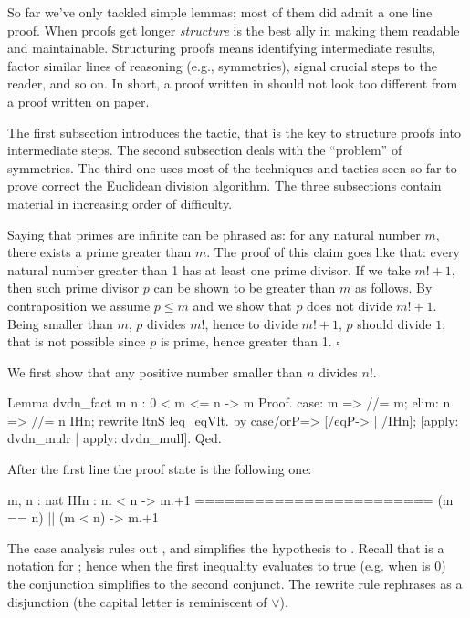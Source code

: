 So far we've only tackled simple lemmas; most of them did admit a one line
proof.  When proofs get longer \emph{structure} is the best ally in making
them readable and maintainable.  Structuring proofs means identifying
intermediate results, factor similar lines of reasoning (e.g., symmetries),
signal crucial steps to the reader, and so on.  In short, a
proof written in \Coq{} should not look too different from a proof
written on paper.

The first subsection introduces the  tactic, that is the key
to structure proofs into intermediate steps.  The second subsection
deals with the ``problem'' of symmetries.  The third one uses most
of the techniques and tactics seen so far to prove correct the
Euclidean division algorithm.  The three subsections contain
material in increasing order of difficulty.

\label{sec:infprimes}

Saying that primes are infinite can be phrased as: for any natural number
$m$, there exists a prime greater than $m$.  The proof of this claim goes like
that: every natural number greater than 1 has at least one prime divisor.  If
we take $m! + 1$, then such prime divisor $p$ can be shown to be greater than $m$ as
follows.  By contraposition we assume $p \leq m$ and we show that $p$
does not divide $m!+1$.
Being smaller than $m$, $p$ divides $m!$, hence to divide $m!+1$, $p$ should divide
$1$; that is not possible since $p$ is prime, hence greater than 1.
\hfill$\square$

We first show that any positive number smaller than $n$ divides $n!$.

\begin{coq}{}{}
Lemma dvdn_fact m n : 0 < m <= n -> m %
Proof.
case: m => //= m; elim: n => //= n IHn; rewrite ltnS leq_eqVlt.
by case/orP=> [/eqP-> | /IHn]; [apply: dvdn_mulr | apply: dvdn_mull].
Qed.
\end{coq}

After the first line the proof state is the following one:

\begin{coqout}{}{}
m, n : nat
IHn : m < n -> m.+1 %
========================
(m == n) || (m < n) -> m.+1 %
\end{coqout}
The case analysis rules out , and simplifies the hypothesis
to .  Recall that  is a notation for ; hence when the first inequality evaluates to true (e.g. when 
is 0) the conjunction simplifies to the second conjunct.  The 
rewrite rule rephrases \C{<=} as a disjunction (the capital  letter
is reminiscent of $\lor$).

